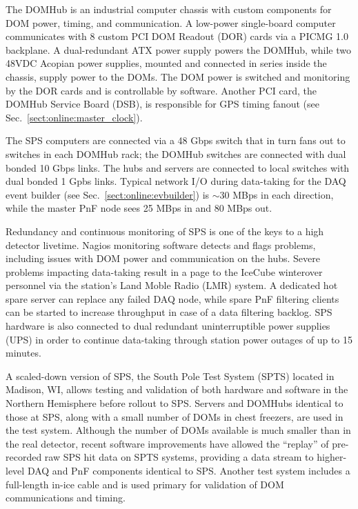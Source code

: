 The DOMHub is an industrial computer chassis with custom components for
DOM power, timing, and communication.  A low-power single-board computer
communicates with 8 custom PCI DOM Readout (DOR) cards via a PICMG 1.0 backplane.  A
dual-redundant ATX power supply powers the DOMHub, while two 48VDC Acopian
power supplies, mounted and connected in series inside the chassis, supply
power to the DOMs.  The DOM power is switched and monitoring by the DOR
cards and is controllable by software.  Another PCI card, the DOMHub
Service Board (DSB), is responsible for GPS timing fanout (see
Sec.~\ref{sect:online:master_clock}).


The SPS computers are connected via a 48 Gbps switch that in turn fans out
to switches in each DOMHub rack; the DOMHub switches are connected with
dual bonded 10 Gbps links.  The hubs and servers are connected to local
switches with dual bonded 1 Gpbs links.  Typical network I/O during data-taking for the
DAQ event builder (see Sec.~\ref{sect:online:evbuilder}) is $\sim30$ MBps in each
direction, while the master PnF node sees 25 MBps in and 80 MBps out.

Redundancy and continuous monitoring of SPS is one of the keys to a high
detector livetime.  Nagios monitoring software detects and flags problems,
including issues with DOM power and communication on the hubs.  Severe
problems impacting data-taking result in a page to the IceCube
winterover personnel via the station's Land Moble Radio (LMR) system. 
A dedicated hot spare server can replace any failed DAQ
node, while spare PnF filtering clients can be started to increase
throughput in case of a data filtering backlog.  SPS hardware is also
connected to dual redundant uninterruptible power supplies 
(UPS) in order to continue data-taking through station power outages of up
to 15 minutes.  

A scaled-down version of SPS, the South Pole Test System (SPTS)
located in Madison, WI, allows
testing and validation of both hardware and software in the Northern
Hemisphere before rollout to SPS.  Servers and DOMHubs identical to those
at SPS, along with a small number of DOMs in chest freezers, are used in
the test system.  Although the number of DOMs available is much smaller
than in the real detector, recent software improvements have allowed the
``replay'' of pre-recorded raw SPS hit data on SPTS systems, providing a data stream to
higher-level DAQ and PnF components identical to SPS.  Another test system
includes a full-length in-ice cable and is used primary for validation of
DOM communications and timing.

